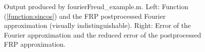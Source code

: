 \documentclass[12pt]{article}
\begin{document}
\begin{figure}[tbh]
   \centering
 \caption{Output produced by fourierFreud\_example.m. Left: Function (\ref{function:sincos}) and the FRP postprocessed Fourier approximation (visually indistinguishable).  Right: Error of the Fourier approximation and the
 reduced error of the postprocessed FRP approximation.
          } \label{fig:fourierFreudExample}
 \end{figure}
 
\end{document}
